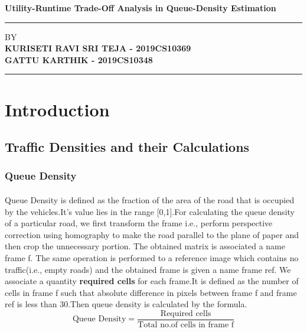\documentclass[12pt]{article}
\begin{document}
\begin{titlepage}
\begin{center}
    \LARGE\textbf{{Utility-Runtime Trade-Off Analysis in Queue-Density Estimation}}\\
    \vspace{5cm}
   
   
    \hrule
     \vspace{1cm}
    \large{BY}\\
      \vspace{0.15cm}
    \Large\textbf{{KURISETI RAVI SRI TEJA - 2019CS10369}}\\
    \Large\textbf{{GATTU KARTHIK - 2019CS10348}}\\
      \vspace{1cm}
    \hrule
    
\end{center}


\end{titlepage}
\tableofcontents

\newpage
\section{Introduction}
\subsection{Traffic Densities and their Calculations}
\subsubsection{Queue Density}
\paragraph{}
  Queue Density is defined as the fraction of the area of the road that is occupied by the vehicles.It's value lies in the range [0,1].For calculating the queue density of a particular road, we first transform the frame i.e., perform perspective correction using homography to make the road parallel to the plane of paper and then crop the unnecessary portion. The obtained matrix is associated a name frame f.  The same operation is performed to a reference image which contains no traffic(i.e., empty roads) and the obtained frame is given a name frame ref. We associate a quantity \textbf{required cells} for each frame.It is defined as the number of cells in frame f such that absolute difference in pixels between frame f and frame ref is less than 30.Then queue density is calculated by the formula.
   \[\text{Queue Density}=\frac{\text{Required cells}} {\text{Total no.of cells in frame f}}\]
   
\end{document}

